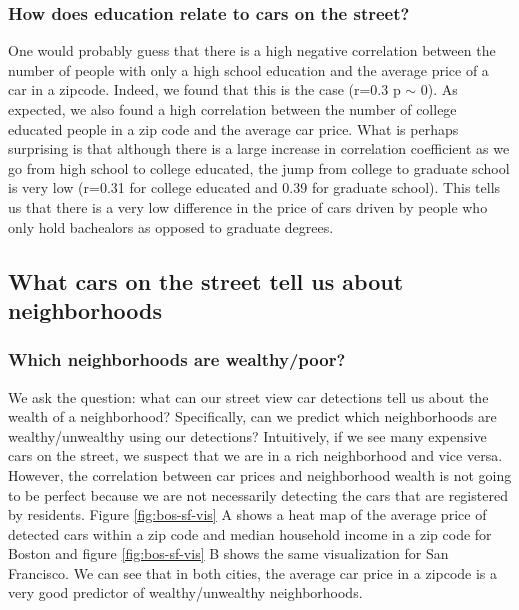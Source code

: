 \documentclass[10pt,twocolumn,letterpaper]{article}
\begin{document}
\subsubsection{How does education relate to cars on the street?}
One would probably guess that there is a high negative correlation between the number of people with only a high school education and the average price of a car in a zipcode. Indeed, we found that this is the case (r=0.3 p \(\sim\) 0). As expected, we also found a high correlation between the number of college educated people in a zip code and the average car price. What is perhaps surprising is that although there is a large increase in correlation coefficient as we go from high school to college educated, the jump from college to graduate school is very low (r=0.31 for college educated and 0.39 for graduate school). This tells us that there is a very low difference in the price of cars driven by people who only hold bachealors as opposed to graduate degrees.

\subsection{What cars on the street tell us about neighborhoods}
\subsubsection{Which neighborhoods are wealthy/poor?}
We ask the question: what can our street view car detections tell us about the wealth of a neighborhood? Specifically, can we predict which neighborhoods are wealthy/unwealthy using our detections? Intuitively, if we see many expensive cars on the street, we suspect that we are in a rich neighborhood and vice versa. However, the correlation between car prices and neighborhood wealth is not going to be perfect because we are not necessarily detecting the cars that are registered by residents. Figure \ref{fig:bos-sf-vis} A shows a heat map of the average price of detected cars within a zip code and median household income in a zip code for Boston and figure \ref{fig:bos-sf-vis} B shows the same visualization for San Francisco. We can see that in both cities, the average car price in a zipcode is a very good predictor of wealthy/unwealthy neighborhoods.
\end{document}
